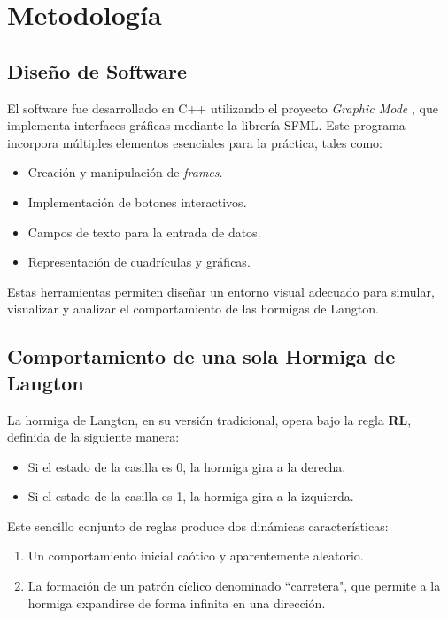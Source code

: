 \documentclass[12pt,twoside]{article}
\begin{document}
\clearpage
\section{Metodología}

\subsection{Diseño de Software}

El software fue desarrollado en C++ utilizando el proyecto \textit{Graphic Mode} \cite{bib:lan5}, que implementa interfaces gráficas mediante la librería SFML. Este programa incorpora múltiples elementos esenciales para la práctica, tales como:  
\begin{itemize}
	\item Creación y manipulación de \textit{frames}.
	\item Implementación de botones interactivos.
	\item Campos de texto para la entrada de datos.
	\item Representación de cuadrículas y gráficas.
\end{itemize}

Estas herramientas permiten diseñar un entorno visual adecuado para simular, visualizar y analizar el comportamiento de las hormigas de Langton.

\subsection{Comportamiento de una sola Hormiga de Langton}

La hormiga de Langton, en su versión tradicional, opera bajo la regla \textbf{RL}, definida de la siguiente manera:  
\begin{itemize}
	\item Si el estado de la casilla es 0, la hormiga gira a la derecha.  
	\item Si el estado de la casilla es 1, la hormiga gira a la izquierda.  
\end{itemize}

Este sencillo conjunto de reglas produce dos dinámicas características:  
\begin{enumerate}
	\item Un comportamiento inicial caótico y aparentemente aleatorio.  
	\item La formación de un patrón cíclico denominado ``carretera", que permite a la hormiga expandirse de forma infinita en una dirección.  
\end{enumerate}
\end{document}

